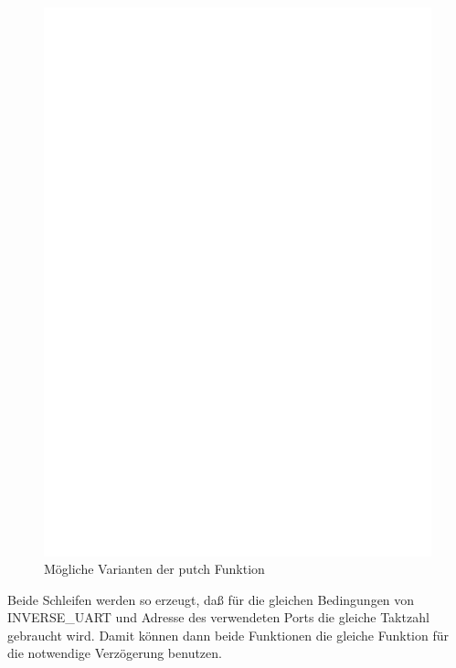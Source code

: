 \begin{figure}[H]
\centering
\includegraphics[]{../FIG/uart_putch_timing.eps}
\caption{Mögliche Varianten der putch Funktion}
\label{fig:putch_timing}
\end{figure}

Beide Schleifen werden so erzeugt, daß für die gleichen Bedingungen von INVERSE\_UART und Adresse des verwendeten
Ports die gleiche Taktzahl gebraucht wird. Damit können dann beide Funktionen die gleiche
Funktion für die notwendige Verzögerung benutzen.

